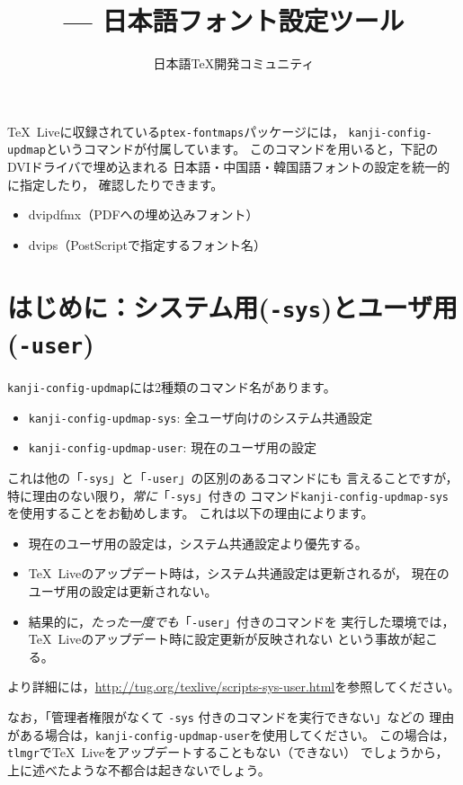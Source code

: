 \documentclass{jlreq}
\title{\command{kanji-config-updmap} --- 日本語フォント設定ツール}
\author{日本語\TeX 開発コミュニティ}
\def\file#1{\texttt{#1}}
\def\command#1{\texttt{#1}}
\def\TL{\TeX\ Live}
\begin{document}
\maketitle

\TL に収録されている\file{ptex-fontmaps}パッケージには，
\command{kanji-config-updmap}というコマンドが付属しています。
このコマンドを用いると，下記のDVIドライバで埋め込まれる
日本語・中国語・韓国語フォントの設定を統一的に指定したり，
確認したりできます。
\begin{itemize}
  \item dvipdfmx（PDFへの埋め込みフォント）
  \item dvips（PostScriptで指定するフォント名）
\end{itemize}


\section{はじめに：システム用(\command{-sys})とユーザ用(\command{-user})}

\command{kanji-config-updmap}には2種類のコマンド名があります。
\begin{itemize}
  \item \command{kanji-config-updmap-sys}: 全ユーザ向けのシステム共通設定
  \item \command{kanji-config-updmap-user}: 現在のユーザ用の設定
\end{itemize}
これは他の「\command{-sys}」と「\command{-user}」の区別のあるコマンドにも
言えることですが，特に理由のない限り，\emph{常に}「\command{-sys}」付きの
コマンド\command{kanji-config-updmap-sys}を使用することをお勧めします。
これは以下の理由によります。
\begin{itemize}
  \item 現在のユーザ用の設定は，システム共通設定より優先する。
  \item \TL のアップデート時は，システム共通設定は更新されるが，
        現在のユーザ用の設定は更新されない。
  \item 結果的に，\emph{たった一度でも}「\command{-user}」付きのコマンドを
        実行した環境では，\TL のアップデート時に設定更新が反映されない
        という事故が起こる。
\end{itemize}
より詳細には，\url{http://tug.org/texlive/scripts-sys-user.html}を参照してください。

なお，「管理者権限がなくて \command{-sys} 付きのコマンドを実行できない」などの
理由がある場合は，\command{kanji-config-updmap-user}を使用してください。
この場合は，\command{tlmgr}で\TL をアップデートすることもない（できない）
でしょうから，上に述べたような不都合は起きないでしょう。
\end{document}
